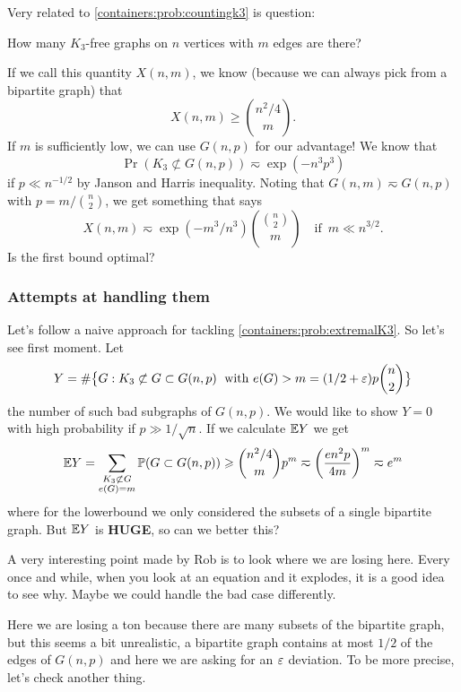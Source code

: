 Very related to \ref{containers:prob:countingk3} is question:
\begin{problem}
	\label{containers:prob:countingk3}
	How many $K_3$-free graphs on $n$ vertices with $m$ edges are there?
\end{problem}
If we call this quantity $X(n,m)$, we know (because we can always
pick from a bipartite graph) that
\[
	X(n,m) \geq \binom{n^2/4}{m}.
\]
If $m$ is sufficiently low, we can use $G(n,p)$ for our advantage! We know that
\[
	\Pr(K_3 \not \subset G(n,p)) \eqsim \exp(-n^3p^3)
\]
if $p \ll n^{-1/2}$ by Janson and Harris inequality. Noting that $G(n,
m) \eqsim G(n,p)$ with $p = m/\binom{n}{2}$,
we get something that says
\[
	X(n,m) \eqsim \exp(-m^3/n^3)\binom{\binom{n}{2}}{m} \quad \text{if
	}\, m \ll n^{3/2}.
\]
Is the first bound optimal?

\subsubsection{Attempts at handling them}

Let's follow a naive approach for tackling
\ref{containers:prob:extremalK3}. So let's see first moment.
Let
\[Y = \#\big\{G: K_3 \not\subset G \subset G(n,p)\; \text{ with }
e(G) > m = (1/2 + \varepsilon)p\binom{n}{2} \big\}\]
the number of such bad subgraphs of $G(n,p)$. We would like to show
$Y = 0$ with high probability if $p \gg 1/\sqrt{n}$. If we calculate
$\mathbb{E} Y$ we get
\[
	\mathbb{E} Y = \sum_{\substack{K_3 \not \subset G\\e(G) = m}} \mathbb{P}(G \subset
	G(n,p)) \geqslant \binom{n^2/4}{m} p^m \eqsim
	\bigg(\frac{en^2p}{4m}\bigg)^m \eqsim e^m
\]
where for the lowerbound we only considered the subsets of a single
bipartite graph. But $\mathbb{E} Y$ is \textbf{HUGE}, so can we better this?

A very interesting point made by Rob is to look where we are losing
here. Every once and while, when you look at an equation and it
explodes, it is a good idea to see why.
Maybe we could handle the bad case differently.

Here we are losing a
ton because there are many subsets of the bipartite graph, but this
seems a bit unrealistic,
a bipartite graph contains at most $1/2$ of the edges of $G(n,p)$ and
here we are asking for an $\varepsilon$ deviation.
To be more precise, let's check another thing.

